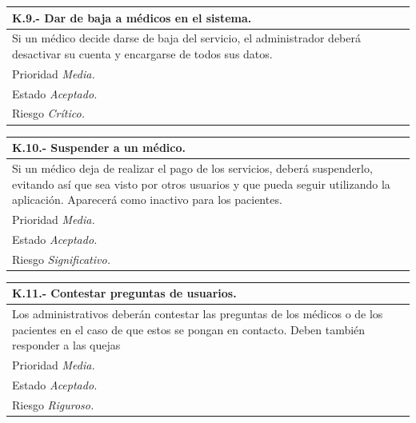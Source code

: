 \documentclass[a4paper,oneside,11pt]{book}
\begin{document}
\begin{center}
\begin{tabulary}{15cm}{|L|}
	\hline
		\bf{K.9.- Dar de baja a médicos en el sistema.} \\
	\hline
		Si un médico decide darse de baja del servicio, el administrador deberá desactivar su cuenta y encargarse de todos sus datos. \\
	\hline
		Prioridad \textit{Media.} \\
	\hline
		Estado \textit{Aceptado.} \\
	\hline
		Riesgo \textit{Crítico.} \\
	\hline
\end{tabulary}
\end{center}

\begin{center}
\begin{tabulary}{15cm}{|L|}
	\hline
		\bf{K.10.- Suspender a un médico.} \\
	\hline
		Si un médico deja de realizar el pago de los servicios, deberá suspenderlo, evitando así que sea visto por otros usuarios y que pueda seguir utilizando la aplicación. Aparecerá como inactivo para los pacientes. \\
	\hline
		Prioridad \textit{Media.} \\
	\hline
		Estado \textit{Aceptado.} \\
	\hline
		Riesgo \textit{Significativo.} \\
	\hline
\end{tabulary}
\end{center}

\begin{center}
\begin{tabulary}{15cm}{|L|}
	\hline
		\bf{K.11.- Contestar preguntas de usuarios.} \\
	\hline
		Los administrativos deberán contestar las preguntas de los médicos o de los pacientes en el caso de que estos se pongan en contacto. Deben también responder a las quejas\\
	\hline
		Prioridad \textit{Media.} \\
	\hline
		Estado \textit{Aceptado.} \\
	\hline
		Riesgo \textit{Riguroso.} \\
	\hline
\end{tabulary}
\end{center}
\end{document}

